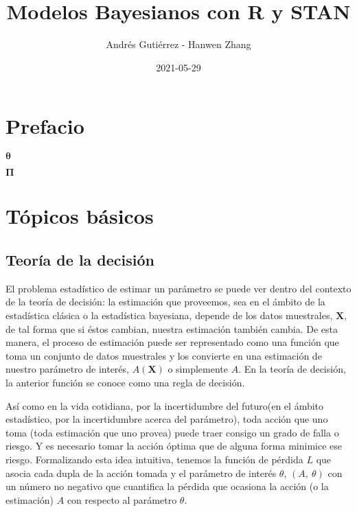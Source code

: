 \documentclass[
  spanish,
  letter]{book}
\title{Modelos Bayesianos con R y STAN}
\author{Andrés Gutiérrez - Hanwen Zhang}
\date{2021-05-29}
\theoremstyle{definition}
\theoremstyle{definition}
\theoremstyle{definition}
\theoremstyle{remark}
\begin{document}
\maketitle

{
\hypersetup{linkcolor=}
\setcounter{tocdepth}{1}
\tableofcontents
}
\hypertarget{prefacio}{%
\chapter{Prefacio}\label{prefacio}}

\(\boldsymbol \theta\)

\(\boldsymbol \Pi \)

\hypertarget{tuxf3picos-buxe1sicos}{%
\chapter{Tópicos básicos}\label{tuxf3picos-buxe1sicos}}

\hypertarget{teoruxeda-de-la-decisiuxf3n}{%
\section{Teoría de la decisión}\label{teoruxeda-de-la-decisiuxf3n}}

El problema estadístico de estimar un parámetro se puede ver dentro del contexto de la teoría de decisión: la estimación que proveemos, sea en el ámbito de la estadística clásica o la estadística bayesiana, depende de los datos muestrales, \(\mathbf{X}\), de tal forma que si éstos cambian, nuestra estimación también cambia. De esta manera, el proceso de estimación puede ser representado como una función que toma un conjunto de datos muestrales y los convierte en una estimación de nuestro parámetro de interés, \(A(\mathbf{X})\) o simplemente \(A\). En la teoría de decisión, la anterior función se conoce como una regla de decisión.

Así como en la vida cotidiana, por la incertidumbre del futuro(en el ámbito estadístico, por la incertidumbre acerca del parámetro), toda acción que uno toma (toda estimación que uno provea) puede traer consigo un grado de falla o riesgo. Y es necesario tomar la acción óptima que de alguna forma minimice ese riesgo. Formalizando esta idea intuitiva, tenemos la función de pérdida \(L\) que asocia cada dupla de la acción tomada y el parámetro de interés \(\theta\), \((A, \ \theta)\) con un número no negativo que cuantifica la pérdida que ocasiona la acción (o la estimación) \(A\) con respecto al parámetro \(\theta\).
\end{document}
